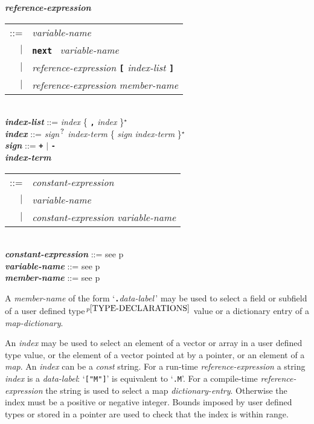 \documentclass[12pt]{article}
\newcommand{\TT}[1]{{\tt \bfseries #1}}
\newcommand{\STAR}{{\Large $^\star$}}
\newcommand{\QMARK}{{$^{\,\mbox{\footnotesize ?}}$}}
\newcommand{\emkey}[1]{{\em \bfseries #1}}
\newcommand{\pagref}[1]{p\pageref{#1}}
\newcommand{\pagnote}[1]{$\,^{p\pageref{#1}}$}
\newenvironment{indpar}[1][0.3in]%
	{\begin{list}{}%
		     {\setlength{\itemsep}{0in}%
		      \setlength{\topsep}{0in}%
		      \setlength{\parsep}{1ex}%
		      \setlength{\labelwidth}{#1}%
		      \setlength{\leftmargin}{#1}%
		      \addtolength{\leftmargin}{\labelsep}}%
	 \item}%
	{\end{list}}
\begin{document}
\begin{indpar}
\emkey{reference-expression}
    \begin{tabular}[t]{rl}
    ::= & {\em variable-name} \\
    $|$ & \TT{next}~ {\em variable-name} \\
    $|$ & {\em reference-expression} \TT{[} {\em index-list} \TT{]} \\
    $|$ & {\em reference-expression} {\em member-name} \\
    \end{tabular}
\\[0.5ex]
\emkey{index-list} ::= {\em index} \{ \TT{,} {\em index} \}\STAR{}
\\[0.5ex]
\emkey{index}\label{REFERENCE-INDEX}
    ::= {\em sign}\QMARK{} {\em index-term}
        \{ {\em sign} {\em index-term} \}\STAR{}
\\[0.5ex]
\emkey{sign} ::= \TT{+} $|$ \TT{-}
\\[0.5ex]
\emkey{index-term}
    \begin{tabular}[t]{rl}
    ::= & {\em constant-expression} \\
    $|$ & {\em variable-name} \\
    $|$ & {\em constant-expression} \TT{*} {\em variable-name} \\
    \end{tabular}
\\[0.5ex]
\emkey{constant-expression} ::= see \pagref{CONSTANT-EXPRESSION}
\\[0.5ex]
\emkey{variable-name} ::= see \pagref{VARIABLE-NAME}
\\[0.5ex]
\emkey{member-name} ::= see \pagref{MEMBER-NAME}
\end{indpar}

A {\em member-name} of the form `\TT{.}{\em data-label}\,'
may be used to select a field or subfield
of a user defined type\pagnote{TYPE-DECLARATIONS} value or
a dictionary entry of a {\em map-dictionary}.

An {\em index} may be used to select an element of a vector
or array in a
user defined type value, or the
element of a vector pointed at by a pointer, or an element
of a {\em map}.  An {\em index} can be a {\em const}
string.  For a run-time {\em reference-expression} a string
{\em index} is a {\em data-label}: `{\tt ["M"]}' is equivalent
to `{\tt .M}'.  For a compile-time {\em reference-expression}
the string is used to select a map {\em dictionary-entry}.
Otherwise the
index must be a positive or negative integer.  Bounds imposed
by user defined types or stored in a pointer are used to
check that the index is within range.
\end{document}
